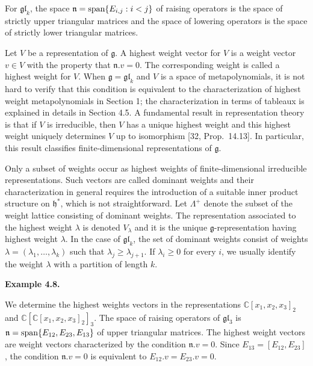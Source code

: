 \documentclass[10pt,a4paper]{article}
\begin{document}
For $\mathfrak{gl}_{k}$, the space $\mathfrak{n}=\textup{span}\{E_{i,j}:i<j\}$ of raising operators is the space of strictly upper triangular matrices and the space of lowering operators is the space of strictly lower triangular matrices.





Let $V$ be a representation of $\mathfrak{g}$. A highest weight vector for $V$ is a weight vector $v\in V$ with the property that $\mathfrak{n}.v=0$. The corresponding weight is called a highest weight for $V$. When $\mathfrak{g}=\mathfrak{gl}_{k}$ and $V$ is a space of metapolynomials, it is not hard to verify that this condition is equivalent to the characterization of highest weight metapolynomials in Section 1; the characterization in terms of tableaux is explained in details in Section 4.5. A fundamental result in representation theory is that if $V$ is irreducible, then $V$ has a unique highest weight and this highest weight uniquely determines $V$ up to isomorphism [32, Prop. 14.13]. In particular, this result classifies finite-dimensional representations of $\mathfrak{g}$.





Only a subset of weights occur as highest weights of finite-dimensional irreducible representations. Such vectors are called dominant weights and their characterization in general requires the introduction of a suitable inner product structure on $\mathfrak{h}^{*}$, which is not straightforward. Let $\Lambda^{+}$ denote the subset of the weight lattice consisting of dominant weights. The representation associated to the highest weight $\lambda$ is denoted $V_{\lambda}$ and it is the unique $\mathfrak{g}$-representation having highest weight $\lambda$. In the case of $\mathfrak{gl}_{k}$, the set of dominant weights consist of weights $\lambda=(\lambda_{1},\ldots,\lambda_{k})$ such that $\lambda_{j}\geq\lambda_{j+1}$. If $\lambda_{i}\geq 0$ for every $i$, we usually identify the weight $\lambda$ with a partition of length $k$.





\par\medskip\noindent\textbf{Example 4.8.}\par



We determine the highest weights vectors in the representations $\mathbb{C}[x_{1},x_{2},x_{3}]_{2}$ and $\mathbb{C}[\mathbb{C}[x_{1},x_{2},x_{3}]_{2}]_{3}$. The space of raising operators of $\mathfrak{gl}_{3}$ is $\mathfrak{n}=\textnormal{span}\{E_{12},E_{23},E_{13}\}$ of upper triangular matrices. The highest weight vectors are weight vectors characterized by the condition $\mathfrak{n}.v=0$. Since $E_{13}=[E_{12},E_{23}]$, the condition $\mathfrak{n}.v=0$ is equivalent to $E_{12}.v=E_{23}.v=0$.
\end{document}
